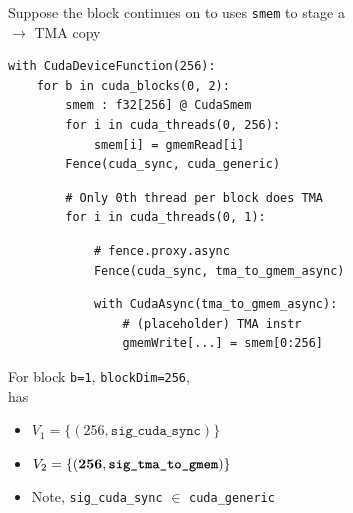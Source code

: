 \begin{minipage}[t]{0.55\textwidth}
\end{minipage}
\newpage
{}

\begin{minipage}[t]{0.55\textwidth}\fixminipage
Suppose the block continues on to uses \texttt{smem} to stage a\\
$\to$ TMA copy

\begin{verbatim}
with CudaDeviceFunction(256):
    for b in cuda_blocks(0, 2):
        smem : f32[256] @ CudaSmem
        for i in cuda_threads(0, 256):
            smem[i] = gmemRead[i]
        Fence(cuda_sync, cuda_generic)

\end{verbatim}
\begin{mdframed}[style=MyFrame, backgroundcolor=greenBoxBg]
\color{greenBoxFg}
\begin{verbatim}
        # Only 0th thread per block does TMA
        for i in cuda_threads(0, 1):
\end{verbatim}
\end{mdframed}
\begin{mdframed}[style=MyFrame, backgroundcolor=violetBoxBg]
\color{violetBoxFg}
\begin{verbatim}
            # fence.proxy.async
            Fence(cuda_sync, tma_to_gmem_async)
\end{verbatim}
\end{mdframed}
\begin{mdframed}[style=MyFrame, backgroundcolor=greenBoxBg]
\color{greenBoxFg}
\begin{verbatim}
            with CudaAsync(tma_to_gmem_async):
                # (placeholder) TMA instr
                gmemWrite[...] = smem[0:256]
\end{verbatim}
\end{mdframed}

For block \texttt{b=1}, \texttt{blockDim=256},\\
 has
\begin{itemize}
  \item $V_1 = \{(256, \texttt{sig\_cuda\_sync})\}$
  \item $V_2 = \{(\mathbf{256}, \textbf{\texttt{sig\_tma\_to\_gmem}})\}$
  \item Note, \texttt{sig\_cuda\_sync} $\in$ \texttt{cuda\_generic}
\end{itemize}
\end{minipage}
